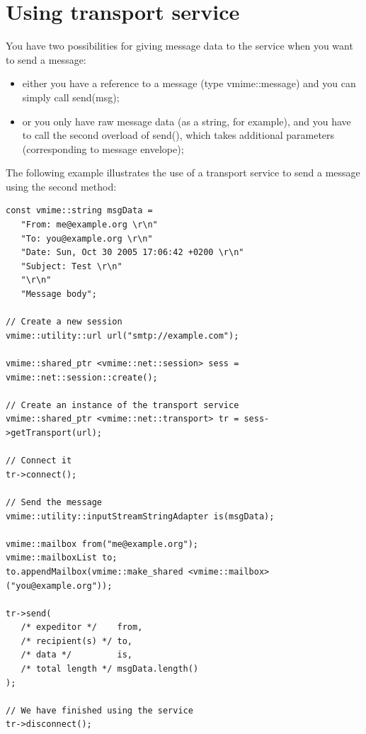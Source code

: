 \section{Using transport service}

You have two possibilities for giving message data to the service when you
want to send a message:

\begin{itemize}
\item either you have a reference to a message (type {\vcode vmime::message})
and you can simply call {\vcode send(msg)};
\item or you only have raw message data (as a string, for example), and you
have to call the second overload of {\vcode send()}, which takes additional
parameters (corresponding to message envelope);
\end{itemize}

The following example illustrates the use of a transport service to send a
message using the second method:

\begin{lstlisting}[caption={Using a transport service}]
const vmime::string msgData =
   "From: me@example.org \r\n"
   "To: you@example.org \r\n"
   "Date: Sun, Oct 30 2005 17:06:42 +0200 \r\n"
   "Subject: Test \r\n"
   "\r\n"
   "Message body";

// Create a new session
vmime::utility::url url("smtp://example.com");

vmime::shared_ptr <vmime::net::session> sess = vmime::net::session::create();

// Create an instance of the transport service
vmime::shared_ptr <vmime::net::transport> tr = sess->getTransport(url);

// Connect it
tr->connect();

// Send the message
vmime::utility::inputStreamStringAdapter is(msgData);

vmime::mailbox from("me@example.org");
vmime::mailboxList to;
to.appendMailbox(vmime::make_shared <vmime::mailbox>("you@example.org"));

tr->send(
   /* expeditor */    from,
   /* recipient(s) */ to,
   /* data */         is,
   /* total length */ msgData.length()
);

// We have finished using the service
tr->disconnect();
\end{lstlisting}


